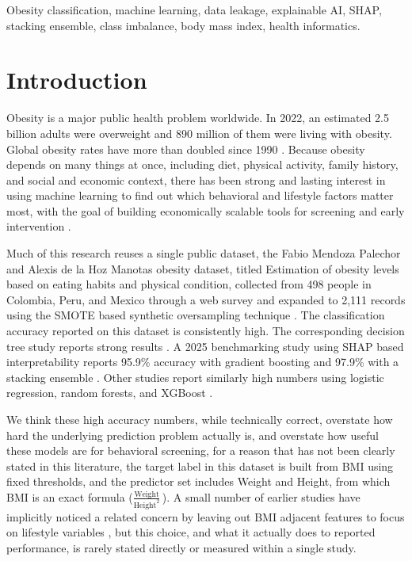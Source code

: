 \documentclass[journal]{IEEEtran}
\begin{document}
\begin{IEEEkeywords}
Obesity classification, machine learning, data leakage, explainable AI, SHAP, stacking ensemble, class imbalance, body mass index, health informatics.
\end{IEEEkeywords}

\section{Introduction}
\label{sec:intro}

Obesity is a major public health problem worldwide. In 2022, an estimated 2.5 billion adults were overweight and 890 million of them were living with obesity. Global obesity rates have more than doubled since 1990 \cite{who2024obesity, ncdrisc2024}. Because obesity depends on many things at once, including diet, physical activity, family history, and social and economic context, there has been strong and lasting interest in using machine learning to find out which behavioral and lifestyle factors matter most, with the goal of building economically scalable tools for screening and early intervention \cite{freitas2024metaanalysis}.

Much of this research reuses a single public dataset, the  Fabio Mendoza Palechor and Alexis de la Hoz Manotas obesity dataset, titled Estimation of obesity levels based on eating habits and physical condition, collected from 498 people in Colombia, Peru, and Mexico through a web survey and expanded to 2{,}111 records using the SMOTE based synthetic oversampling technique \cite{palechor2019dataset, chawla2002smote}. The classification accuracy reported on this dataset is consistently high. The corresponding decision tree study reports strong results \cite{delahoz2019obesity}. A 2025 benchmarking study using SHAP based interpretability reports 95.9\% accuracy with gradient boosting and 97.9\% with a stacking ensemble \cite{benchmarking2025shap}. Other studies report similarly high numbers using logistic regression, random forests, and XGBoost \cite{ratih2019estimation}.

We think these high accuracy numbers, while technically correct, overstate how hard the underlying prediction problem actually is, and overstate how useful these models are for behavioral screening, for a reason that has not been clearly stated in this literature, the target label in this dataset is built from BMI using fixed thresholds, and the predictor set includes Weight and Height, from which BMI is an exact formula ($\frac{\mathrm{Weight}}{\mathrm{Height}^2}\,$). A small number of earlier studies have implicitly noticed a related concern by leaving out BMI adjacent features to focus on lifestyle variables \cite{oyelude2023lifestyle}, but this choice, and what it actually does to reported performance, is rarely stated directly or measured within a single study.
\end{document}
